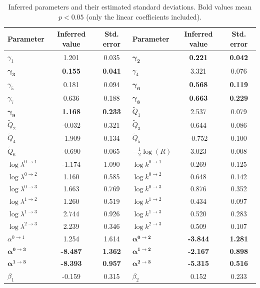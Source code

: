 \documentclass{sn-jnl}
\begin{document}
\begin{table}[H]
    \centering
    \begin{tabular}{lcc|lcc}
    \hline
    Parameter & Inferred value & Std. error & Parameter & Inferred value & Std. error \\
    \hline
    $\gamma_1$ &1.201 &0.035 &$\boldsymbol{\gamma_2}$ &\textbf{0.221} &\textbf{0.042} \\
    $\boldsymbol{\gamma_3}$ &\textbf{0.155} &\textbf{0.041} &$\gamma_4$ &3.321 &0.076 \\
    $\gamma_5$ &0.181 &0.094 &$\boldsymbol{\gamma_6}$ &\textbf{0.568} &\textbf{0.119} \\
    $\gamma_7$ &0.636 &0.188 &$\boldsymbol{\gamma_8}$ &\textbf{0.663} &\textbf{0.229} \\
    $\boldsymbol{\gamma_9}$ &\textbf{1.168} &\textbf{0.233} &$\tilde{Q}_1$ &2.537 &0.079 \\
    $\tilde{Q}_2$ &-0.032 &0.321 &$\tilde{Q}_3$ &0.644 &0.086 \\
    $\tilde{Q}_4$ &-1.909 &0.134 &$\tilde{Q}_5$ &-0.752 &0.100 \\
    $\tilde{Q}_6$ &-0.690 &0.065 &$-\frac{1}{2}\log(R)$ &3.023 &0.008 \\
    $\log \lambda^{0 \to 1}$ &-1.174 &1.090 &$\log k^{0 \to 1}$ &0.269 &0.125 \\
    $\log \lambda^{0 \to 2}$ &1.160 &0.585 &$\log k^{0 \to 2}$ &0.648 &0.142 \\
    $\log \lambda^{0 \to 3}$ &1.663 &0.769 &$\log k^{0 \to 3}$ &0.876 &0.352 \\
    $\log \lambda^{1 \to 2}$ &1.260 &0.519 &$\log k^{1 \to 2}$ &0.434 &0.097 \\
    $\log \lambda^{1 \to 3}$ &2.744 &0.926 &$\log k^{1 \to 3}$ &0.520 &0.283 \\
    $\log \lambda^{2 \to 3}$ &2.239 &0.346 &$\log k^{2 \to 3}$ &0.509 &0.107 \\
    $\alpha^{0 \to 1}$ &1.254 &1.614 &$\boldsymbol{\alpha^{0 \to 2}}$ &\textbf{-3.844} &\textbf{1.281} \\
    $\boldsymbol{\alpha^{0 \to 3}}$ &\textbf{-8.487} &\textbf{1.362} &$\boldsymbol{\alpha^{1 \to 2}}$ &\textbf{-2.167} &\textbf{0.898} \\
    $\boldsymbol{\alpha^{1 \to 3}}$ &\textbf{-8.393} &\textbf{0.957} &$\boldsymbol{\alpha^{2 \to 3}}$ &\textbf{-5.315} &\textbf{0.516} \\
    $\beta_1$ &-0.159 &0.315 &$\beta_2$ &0.152 &0.233 \\
    \hline
    \end{tabular}
    \bigbreak
    \caption{Inferred parameters and their estimated standard deviations. Bold values mean $p < 0.05$ (only the linear coefficients included).}
    \label{tbl:paquid-fit}
\end{table}
\end{document}
